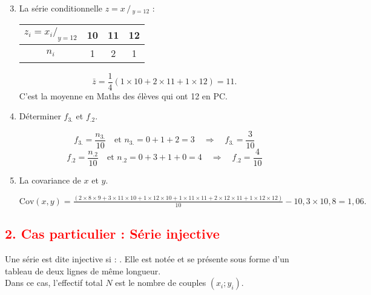 \documentclass[12pt,a4paper]{article}
\begin{document}
\begin{enumerate}
    \setcounter{enumi}{2} %
    \item La série conditionnelle \( z = x \,/\,_{y=12} \) :

    \begin{center}
    \begin{tabular}{|c|c|c|c|}
    \hline
    \( z_i = x_i /_{y=12} \) & 10 & 11 & 12 \\
    \hline
    \( n_i \) & 1 & 2 & 1 \\
    \hline
    \end{tabular}
    \end{center}

    \[
    \bar{z} = \frac{1}{4}(1 \times 10 + 2 \times 11 + 1 \times 12) = 11.
    \]
    C’est la moyenne en Maths des élèves qui ont 12 en PC.

    \item Déterminer \( f_{3.} \) et \( f_{.2} \).

    \[
    f_{3.} = \frac{n_{3.}}{10} \quad \text{et } n_{3.} = 0 + 1 + 2 = 3 \quad \Rightarrow \quad f_{3.} = \frac{3}{10}
    \]
    \[
    f_{.2} = \frac{n_{.2}}{10} \quad \text{et } n_{.2} = 0 + 3 + 1 + 0 = 4 \quad \Rightarrow \quad f_{.2} = \frac{4}{10}
    \]

    \item La covariance de \( x \) et \( y \).

    \(
    \text{Cov}(x, y) = \frac{
    (2 \times 8 \times 9 + 3 \times 11 \times 10 + 1 \times 12 \times 10 + 1 \times 11 \times 11 + 2 \times 12 \times 11 + 1 \times 12 \times 12)
    }{10} - 10{,}3 \times 10{,}8 = 1{,}06.
    \)
\end{enumerate}

\subsection*{\textcolor{red}{2. Cas particulier : Série injective}}

Une série est dite injective si : 
. 
Elle est notée 
et se présente sous forme d’un tableau de deux lignes de même longueur.\\
Dans ce cas, l’effectif total \( N \) est le nombre de couples \( (x_i ; y_i) \).
\end{document}
